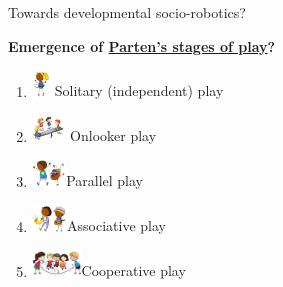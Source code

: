 \documentclass[compress]{beamer}
\begin{document}
\begin{frame}{Towards developmental socio-robotics?}

    \Large
    {\bf Emergence of \hyperlink{parten}{Parten's stages of
            play}?}

            \small

    \begin{enumerate}
        \item \includegraphics[height=0.7cm]{figs/stagesofplay/solitary} {Solitary (independent) play}
        \item \includegraphics[height=0.7cm]{figs/stagesofplay/onlooker} {Onlooker play}
        \item \includegraphics[height=0.7cm]{figs/stagesofplay/parallel}{Parallel play}
        \item \includegraphics[height=0.7cm]{figs/stagesofplay/associative}{Associative play}
        \item \includegraphics[height=0.7cm]{figs/stagesofplay/cooperative}{Cooperative play}
    \end{enumerate}

\end{frame}
\end{document}
